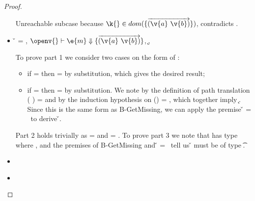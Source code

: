 \begin{lemma}
\begin{proof}
\begin{case}[T-GetHMapAbsent]
\begin{itemize}
\begin{subcase}[B-Get]
       Unreachable subcase because 
         $\keyinmap{\k{}}{\curlymap{\overrightarrow{({\v{a}}\ {\v{b}})}}}$,
         contradicts
                {\inabsent{\k{}}{\absent{}}}.
      \end{subcase}
    \item[]
      \begin{subcase}[B-GetMissing]
        \v{} = \nil,
        $\opsem {\openv{}}
        {\e{m}} {\curlymap{\overrightarrow{({\v{a}}\ {\v{b}})}}}$,
       \opsem {\openv{}} {} {\k{}},

         To prove part 1 we consider two cases on the form of : 
         \begin{itemize}
           \item
         if {} = \emptyobject{}
         then \object{} = \emptyobject{} by substitution, which gives the desired result;
           \item
         if  = { {}}
         then \object{} = { {}} by substitution.
         We note by the definition of path translation
         {\openv{}}({ {}}) =
         {}
         and by the induction hypothesis on 
         {{\openv{}}()} = {},
         which together imply 
         \inopenv {\openv{}} {\object{}} { {\k{}}}.
         Since this is the same form as B-GetMissing, we can apply the premise
        \v{} = \nil\ 
         to derive \inopenv {\openv{}} {\object{}} {\v{}}.
         \end{itemize}
         
         Part 2 holds trivially as \thenprop{\prop{}} = {\topprop{}}
         and \elseprop{\prop{}} = {\topprop{}}.
         To prove part 3 we note that  has type {\HMapgeneric {\mandatory{}} {\absent{}}}
         where {\inabsent{\k{}}{\absent{}}}, and
         the premises of B-GetMissing
         and
          \v{} = \nil\ 
         tell us {\v{}} must be of type {\t{}}.
      \end{subcase}
    \item[]
      \begin{subcase}[BE-Get1]
      \end{subcase}
    \item[]
      \begin{subcase}[BE-Get2]
      \end{subcase}
  \end{itemize}
\end{case}


\end{proof}
\end{lemma}
